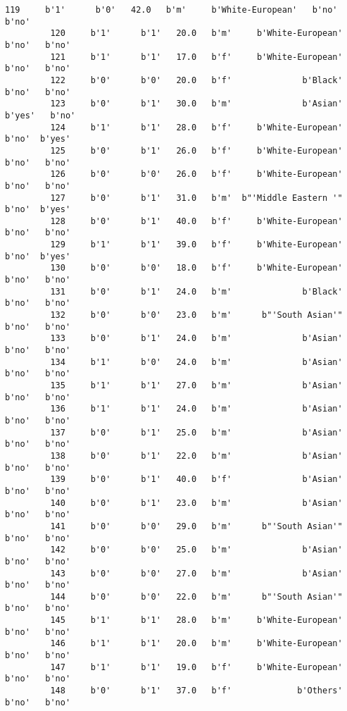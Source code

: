 \documentclass[11pt]{article}
\begin{document}
\begin{Verbatim}[commandchars=\\\{\}]
         119     b'1'      b'0'   42.0   b'm'     b'White-European'   b'no'   b'no'   
         120     b'1'      b'1'   20.0   b'm'     b'White-European'   b'no'   b'no'   
         121     b'1'      b'1'   17.0   b'f'     b'White-European'   b'no'   b'no'   
         122     b'0'      b'0'   20.0   b'f'              b'Black'   b'no'   b'no'   
         123     b'0'      b'1'   30.0   b'm'              b'Asian'  b'yes'   b'no'   
         124     b'1'      b'1'   28.0   b'f'     b'White-European'   b'no'  b'yes'   
         125     b'0'      b'1'   26.0   b'f'     b'White-European'   b'no'   b'no'   
         126     b'0'      b'0'   26.0   b'f'     b'White-European'   b'no'   b'no'   
         127     b'0'      b'1'   31.0   b'm'  b"'Middle Eastern '"   b'no'  b'yes'   
         128     b'0'      b'1'   40.0   b'f'     b'White-European'   b'no'   b'no'   
         129     b'1'      b'1'   39.0   b'f'     b'White-European'   b'no'  b'yes'   
         130     b'0'      b'0'   18.0   b'f'     b'White-European'   b'no'   b'no'   
         131     b'0'      b'1'   24.0   b'm'              b'Black'   b'no'   b'no'   
         132     b'0'      b'0'   23.0   b'm'      b"'South Asian'"   b'no'   b'no'   
         133     b'0'      b'1'   24.0   b'm'              b'Asian'   b'no'   b'no'   
         134     b'1'      b'0'   24.0   b'm'              b'Asian'   b'no'   b'no'   
         135     b'1'      b'1'   27.0   b'm'              b'Asian'   b'no'   b'no'   
         136     b'1'      b'1'   24.0   b'm'              b'Asian'   b'no'   b'no'   
         137     b'0'      b'1'   25.0   b'm'              b'Asian'   b'no'   b'no'   
         138     b'0'      b'1'   22.0   b'm'              b'Asian'   b'no'   b'no'   
         139     b'0'      b'1'   40.0   b'f'              b'Asian'   b'no'   b'no'   
         140     b'0'      b'1'   23.0   b'm'              b'Asian'   b'no'   b'no'   
         141     b'0'      b'0'   29.0   b'm'      b"'South Asian'"   b'no'   b'no'   
         142     b'0'      b'0'   25.0   b'm'              b'Asian'   b'no'   b'no'   
         143     b'0'      b'0'   27.0   b'm'              b'Asian'   b'no'   b'no'   
         144     b'0'      b'0'   22.0   b'm'      b"'South Asian'"   b'no'   b'no'   
         145     b'1'      b'1'   28.0   b'm'     b'White-European'   b'no'   b'no'   
         146     b'1'      b'1'   20.0   b'm'     b'White-European'   b'no'   b'no'   
         147     b'1'      b'1'   19.0   b'f'     b'White-European'   b'no'   b'no'   
         148     b'0'      b'1'   37.0   b'f'             b'Others'   b'no'   b'no'   

\end{Verbatim}
\end{document}
